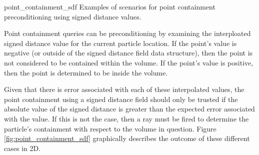               {point_containment_sdf}
              {Examples of scenarios for point containment preconditioning using signed distance values.}
              {
                Point containment queries can be preconditioning by examining
                the interploated signed distance value for the current particle
                location. If the point's value is negative (or outside of the
                signed distance field data structure), then the point is not
                considered to be contained within the volume. If the point's
                value is positive, then the point is determined to be inside the
                volume.

                Given that there is error associated with each of these
                interpolated values, the point containment using a signed
                distance field should only be trusted if the absolute value of
                the signed distance is greater than the expected error
                associated with the value. If this is not the case, then a ray
                must be fired to determine the particle's containment with
                respect to the volume in question. Figure
                \ref{fig:point_containment_sdf} graphically describes the
                outcome of these different cases in 2D.
              }


